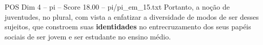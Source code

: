 \begin{textsample}{POS Dim 4 – pi – Score 18.00 – pi/pi\_em\_15.txt}
Portanto, a noção de juventudes, no plural, com vista a enfatizar a diversidade de modos de ser desses sujeitos, que constroem suas \textbf{identidades} no entrecruzamento dos seus papéis sociais de ser jovem e ser estudante no ensino médio.

\end{textsample}

